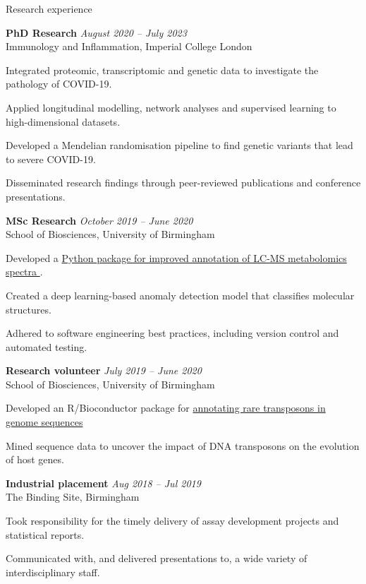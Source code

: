 \documentclass{resume}
\begin{document}
\begin{rSection}{Research experience}

\vspace{1pt plus 1pt}

\textbf{PhD Research} \hfill \textit{August 2020 -- July 2023} \\
Immunology and Inflammation, Imperial College London

\vspace{2pt plus 1pt minus 1pt}
\item Integrated proteomic, transcriptomic and genetic data to investigate the pathology of COVID-19.
\item Applied longitudinal modelling, network analyses and supervised learning to high-dimensional datasets.
\item Developed a Mendelian randomisation pipeline to find genetic variants that lead to severe COVID-19.
\item Disseminated research findings through peer-reviewed publications and conference presentations. 

\textbf{MSc Research} \hfill \textit{October 2019 -- June 2020} \\
School of Biosciences, University of Birmingham

\vspace{2pt plus 1pt minus 1pt}
\item Developed a \href{https://github.com/jackgisby/metaboblend}{Python package for improved annotation of LC-MS metabolomics spectra \faGithub}.
\item Created a deep learning-based anomaly detection model that classifies molecular structures. %
\item Adhered to software engineering best practices, including version control and automated testing.

\textbf{Research volunteer} \hfill \textit{July 2019 -- June 2020} \\
School of Biosciences, University of Birmingham

\vspace{2pt plus 1pt minus 1pt}
\item Developed an R/Bioconductor package for \href{https://bioconductor.org/packages/release/bioc/html/packFinder.html}{annotating rare transposons in genome sequences \faGithub}
\item Mined sequence data to uncover the impact of DNA transposons on the evolution of host genes.

\textbf{Industrial placement} \hfill \textit{Aug 2018 -- Jul 2019} \\
The Binding Site, Birmingham

\vspace{2pt plus 1pt minus 1pt}
\item Took responsibility for the timely delivery of assay development projects and statistical reports.
\item Communicated with, and delivered presentations to, a wide variety of interdisciplinary staff.

\end{rSection}
\end{document}
